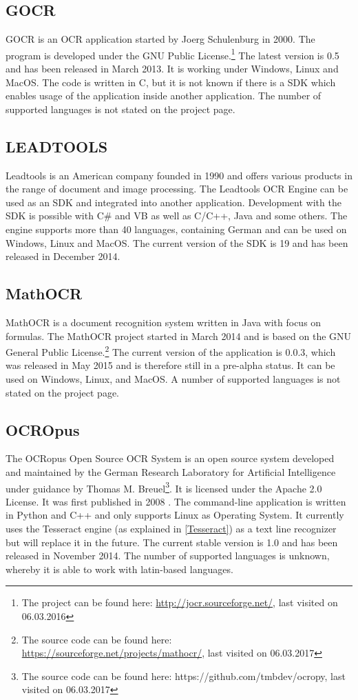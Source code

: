 \subsection{GOCR}
\label{sec3.1.4}
GOCR is an OCR application started by Joerg Schulenburg in 2000. The program is developed under the GNU Public License.\footnote{The project can be found here: \url{http://jocr.sourceforge.net/}, last visited on 06.03.2016} The latest version is 0.5 and has been released in March 2013. It is working under Windows, Linux and MacOS. The code is written in C, but it is not known if there is a SDK which enables usage of the application inside another application. The number of supported languages is not stated on the project page.

\subsection{LEADTOOLS}
\label{sec3.1.5}
Leadtools is an American company founded in 1990 and offers various products in the range of document and image processing. The Leadtools OCR Engine can be used as an SDK and integrated into another application. Development with the SDK is possible with C\# and VB as well as C/C++, Java and some others. The engine supports more than 40 languages, containing German and can be used on Windows, Linux and MacOS. 
The current version of the SDK is 19 and has been released in December 2014.

\subsection{MathOCR}
\label{sec3.1.6}
MathOCR is a document recognition system written in Java with focus on formulas. The MathOCR project started in March 2014 and is based on the GNU General Public License.\footnote{The source code can be found here: \url{https://sourceforge.net/projects/mathocr/}, last visited on 06.03.2017} The current version of the application is 0.0.3, which was released in May 2015 and is therefore still in a pre-alpha status. It can be used on Windows, Linux, and MacOS. A number of supported languages is not stated on the project page.

\subsection{OCROpus}
\label{sec3.1.7}
The OCRopus Open Source OCR System is an open source system developed and maintained by the German Research Laboratory for Artificial Intelligence under guidance by Thomas M. Breuel\footnote{The source code can be found here: https://github.com/tmbdev/ocropy, last visited on 06.03.2017}. It is licensed under the Apache 2.0 License. It was first published in 2008 \cite{Breuel08}.
The command-line application is written in Python and C++ and only supports Linux as Operating System. It currently uses the Tesseract engine (as explained in \ref{Tesseract}) as a text line recognizer but will replace it in the future. The current stable version is 1.0 and has been released in November 2014. The number of supported languages is unknown, whereby it is able to work with latin-based languages.

